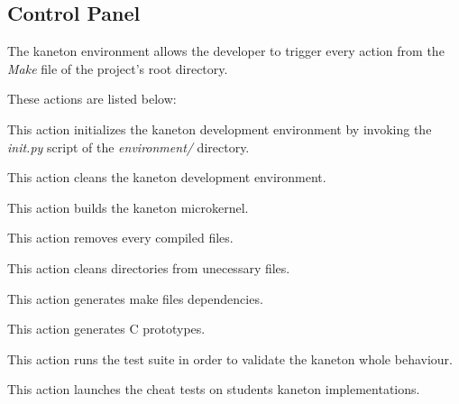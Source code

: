 %
%
%
%
%
%

%
%

\subsection{Control Panel}

The kaneton environment allows the developer to trigger every action from
the \textit{Make} file of the project's root directory.

These actions are listed below:

        {
	  This action initializes the kaneton development environment by
	  invoking the \textit{init.py} script of the \textit{environment/}
	  directory.

	}

	{
	  This action cleans the kaneton development environment.

	}

	{
	  This action builds the kaneton microkernel.

	}

	{
	  This action removes every compiled files.

	}

	{
	  This action cleans directories from unecessary files.

	}

	{
	  This action generates make files dependencies.

	}

	{
	  This action generates C prototypes.

	}

	{
	  This action runs the test suite in order to validate the kaneton
	  whole behaviour.

	}

	{
	  This action launches the cheat tests on students kaneton
	  implementations.


	}


